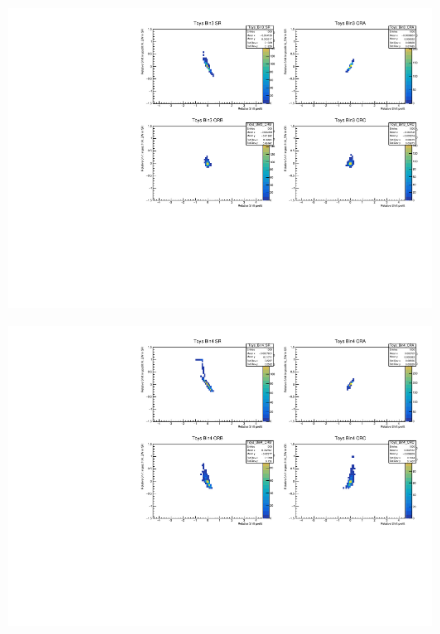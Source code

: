 \begin{figure}[H]
\includegraphics[width=\textwidth]{plots/diffx/instab/linearfx/instabilities_mjj_QCD_Sh2211_Signal_Sh2211_BSMCQCDSTATS_linearfx_newbinning_madgraphasimov_bin3.pdf}
\end{figure}
\begin{figure}[H]
\includegraphics[width=\textwidth]{plots/diffx/instab/linearfx/instabilities_mjj_QCD_Sh2211_Signal_Sh2211_BSMCQCDSTATS_linearfx_newbinning_madgraphasimov_bin4.pdf}
\end{figure}

